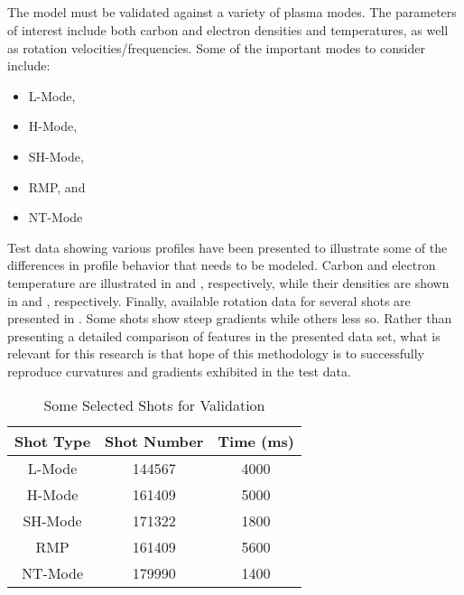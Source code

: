 \subsection{}


The model must be validated against a variety of plasma modes. The parameters of interest include both carbon and electron densities and temperatures, as well as rotation velocities/frequencies. Some of the important modes to consider include:

\begin{itemize}
	\item \gls{L-Mode},
	\item \gls{H-Mode},
	\item \gls{SH-Mode},
	\item \ac{RMP}, and
	\item \gls{NT-Mode}
\end{itemize}

Test data showing various profiles have been presented to illustrate some of the differences in profile behavior that needs to be modeled. 
Carbon and electron temperature are illustrated in  and , respectively, while their densities are shown in  and , respectively. Finally, available rotation data for several shots are presented in . Some shots show steep gradients while others less so. Rather than presenting a detailed comparison of features in the presented data set, what is relevant for this research is that hope of this methodology is to successfully reproduce curvatures and gradients exhibited in the test data.

\begin{table}
	\centering
	\caption{Some Selected Shots for Validation}
	\begin{tabular}{|c|c|c|}
		\hline
		Shot Type & Shot Number & Time (ms) \\
		\hline
		L-Mode & 144567 & 4000 \\
		\hline
		H-Mode & 161409 & 5000 \\
		\hline
		SH-Mode & 171322 & 1800 \\
		\hline
		RMP & 161409 & 5600 \\
		\hline
		NT-Mode & 179990 & 1400 \\
		\hline
	\end{tabular}
	\label{tab:SelectedShots}
\end{table}

\clearpage


